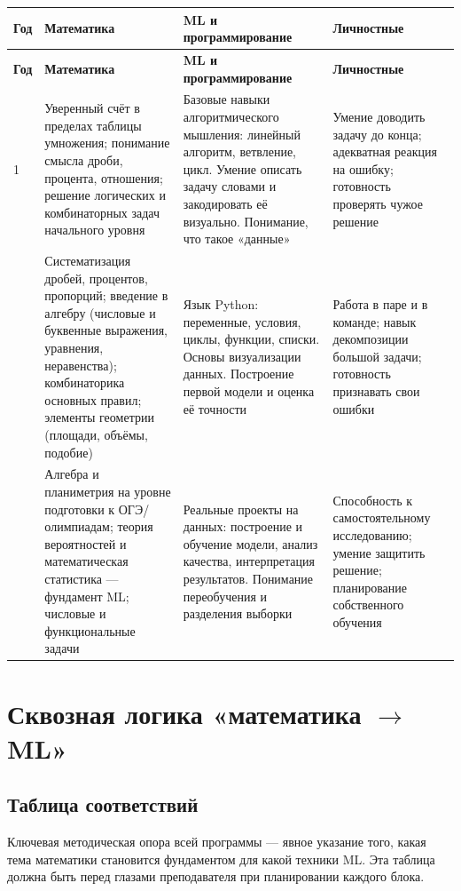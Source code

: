\documentclass[12pt,a4paper]{article}
\begin{document}
\begin{longtable}{L{2.4cm}L{4.3cm}L{4.3cm}L{4.3cm}}
\toprule
\textbf{Год} & \textbf{Математика} & \textbf{ML и программирование} & \textbf{Личностные}\\
\midrule
\endfirsthead

\toprule
\textbf{Год} & \textbf{Математика} & \textbf{ML и программирование} & \textbf{Личностные}\\
\midrule
\endhead

1 & Уверенный счёт в пределах таблицы умножения; понимание смысла дроби,
процента, отношения; решение логических и комбинаторных задач
начального уровня & Базовые навыки алгоритмического мышления: линейный
алгоритм, ветвление, цикл. Умение описать задачу словами и
закодировать её визуально. Понимание, что такое «данные» &
Умение доводить задачу до конца; адекватная реакция на ошибку;
готовность проверять чужое решение\\
 & Систематизация дробей, процентов, пропорций; введение в алгебру
(числовые и буквенные выражения, уравнения, неравенства); комбинаторика
основных правил; элементы геометрии (площади, объёмы, подобие) & Язык
Python: переменные, условия, циклы, функции, списки. Основы
визуализации данных. Построение первой модели и оценка её точности &
Работа в паре и в команде; навык декомпозиции большой задачи;
готовность признавать свои ошибки\\
 & Алгебра и планиметрия на уровне подготовки к ОГЭ/олимпиадам;
теория вероятностей и математическая статистика --- фундамент ML;
числовые и функциональные задачи & Реальные проекты на данных:
построение и обучение модели, анализ качества, интерпретация
результатов. Понимание переобучения и разделения выборки &
Способность к самостоятельному исследованию; умение защитить
решение; планирование собственного обучения\\
\bottomrule
\end{longtable}

\section{Сквозная логика «математика $\rightarrow$ ML»}

\subsection{Таблица соответствий}

Ключевая методическая опора всей программы --- явное указание того,
какая тема математики становится фундаментом для какой техники ML.
Эта таблица должна быть перед глазами преподавателя при планировании
каждого блока.
\end{document}
